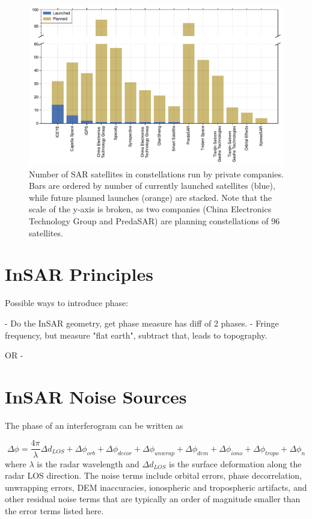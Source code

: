 \documentclass{utexasthesis}
\begin{document}
\begin{figure}[!htbp]
	\centering
	\includegraphics[width=1.0\textwidth]{figures/chapter3-sar/sar-private-constellations.pdf}
	\caption[Private sector SAR constellations]{Number of SAR satellites in constellations run by private companies. Bars are ordered by number of currently launched satellites (blue), while future planned launches (orange) are stacked. Note that the scale of the y-axis is broken, as two companies (China Electronics Technology Group and PredaSAR) are planning constellations of 96 satellites.
	}
	\label{fig:sar-private-const}
\end{figure}



\section{InSAR Principles}


Possible ways to introduce phase:

- Do the InSAR geometry, get phase measure has diff of 2 phases.
- Fringe frequency, but measure "flat earth", subtract that, leads to topography.

OR
- 

\section{InSAR Noise Sources}
\label{sec:ch3-noise}

The phase of an interferogram can be written as

 \citep{Zebker1992DecorrelationInterferometricRadar, Zebker1994AccuracyTopographicMaps, Zebker1997AtmosphericEffectsInterferometric}
\begin{equation}
	\Delta \phi = \frac{4 \pi}{\lambda} \Delta d_{LOS} +  \Delta \phi_{orb} + \Delta \phi_{decor} + \Delta \phi_{unwrap}  + \Delta \phi_{dem} + \Delta \phi_{iono} + \Delta \phi_{tropo}  + \Delta \phi_{n}
\end{equation}
where $ \lambda $ is the radar wavelength and $ \Delta d_{LOS} $ is the surface deformation along the radar LOS direction. The noise terms include orbital errors, phase decorrelation, unwrapping errors, DEM inaccuracies, ionospheric and tropospheric artifacts, and other residual noise terms that are typically an order of magnitude smaller than the error terms listed here.
\end{document}

